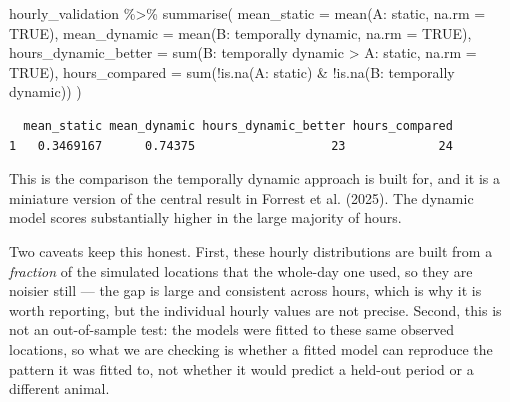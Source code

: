 \documentclass[
  letterpaper,
  DIV=11,
  numbers=noendperiod]{scrartcl}
\newenvironment{Shaded}{\begin{snugshade}}{\end{snugshade}}
\newcommand{\AttributeTok}[1]{\textcolor[rgb]{0.40,0.45,0.13}{#1}}
\newcommand{\ConstantTok}[1]{\textcolor[rgb]{0.56,0.35,0.01}{#1}}
\newcommand{\FunctionTok}[1]{\textcolor[rgb]{0.28,0.35,0.67}{#1}}
\newcommand{\NormalTok}[1]{\textcolor[rgb]{0.00,0.23,0.31}{#1}}
\newcommand{\SpecialCharTok}[1]{\textcolor[rgb]{0.37,0.37,0.37}{#1}}
\newcommand{\StringTok}[1]{\textcolor[rgb]{0.13,0.47,0.30}{#1}}
\begin{document}
\begin{Shaded}
\begin{Highlighting}[]
\NormalTok{hourly\_validation }\SpecialCharTok{\%\textgreater{}\%}
  \FunctionTok{summarise}\NormalTok{(}
    \AttributeTok{mean\_static  =} \FunctionTok{mean}\NormalTok{(}\StringTok{\textasciigrave{}}\AttributeTok{A: static}\StringTok{\textasciigrave{}}\NormalTok{, }\AttributeTok{na.rm =} \ConstantTok{TRUE}\NormalTok{),}
    \AttributeTok{mean\_dynamic =} \FunctionTok{mean}\NormalTok{(}\StringTok{\textasciigrave{}}\AttributeTok{B: temporally dynamic}\StringTok{\textasciigrave{}}\NormalTok{, }\AttributeTok{na.rm =} \ConstantTok{TRUE}\NormalTok{),}
    \AttributeTok{hours\_dynamic\_better =} \FunctionTok{sum}\NormalTok{(}\StringTok{\textasciigrave{}}\AttributeTok{B: temporally dynamic}\StringTok{\textasciigrave{}} \SpecialCharTok{\textgreater{}} \StringTok{\textasciigrave{}}\AttributeTok{A: static}\StringTok{\textasciigrave{}}\NormalTok{, }\AttributeTok{na.rm =} \ConstantTok{TRUE}\NormalTok{),}
    \AttributeTok{hours\_compared =} \FunctionTok{sum}\NormalTok{(}\SpecialCharTok{!}\FunctionTok{is.na}\NormalTok{(}\StringTok{\textasciigrave{}}\AttributeTok{A: static}\StringTok{\textasciigrave{}}\NormalTok{) }\SpecialCharTok{\&} \SpecialCharTok{!}\FunctionTok{is.na}\NormalTok{(}\StringTok{\textasciigrave{}}\AttributeTok{B: temporally dynamic}\StringTok{\textasciigrave{}}\NormalTok{))}
\NormalTok{  )}
\end{Highlighting}
\end{Shaded}

\begin{verbatim}
  mean_static mean_dynamic hours_dynamic_better hours_compared
1   0.3469167      0.74375                   23             24
\end{verbatim}

This is the comparison the temporally dynamic approach is built for, and
it is a miniature version of the central result in Forrest et al.
(2025). The dynamic model scores substantially higher in the large
majority of hours.

Two caveats keep this honest. First, these hourly distributions are
built from a \emph{fraction} of the simulated locations that the
whole-day one used, so they are noisier still --- the gap is large and
consistent across hours, which is why it is worth reporting, but the
individual hourly values are not precise. Second, this is not an
out-of-sample test: the models were fitted to these same observed
locations, so what we are checking is whether a fitted model can
reproduce the pattern it was fitted to, not whether it would predict a
held-out period or a different animal.
\end{document}
